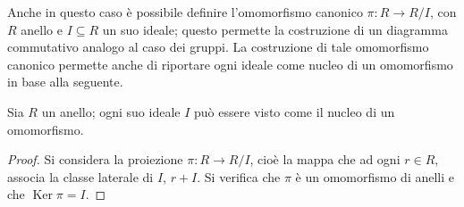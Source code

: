 \documentclass[11pt, a4paper]{scrartcl}
\theoremstyle{definition}
\numberwithin{esempio}{section}
\theoremstyle{definition}
\numberwithin{obs}{section}
\numberwithin{nota}{section}
\numberwithin{equation}{subsection}
\begin{document}
\noindent Anche in questo caso \`e possibile definire l'omomorfismo canonico $\pi : R \to R / I$, con $R$ anello e $I \subseteq R$ un suo ideale; questo permette la costruzione di un diagramma commutativo analogo al caso dei gruppi.
La costruzione di tale omomorfismo canonico permette anche di riportare ogni ideale come nucleo di un omomorfismo in base alla seguente.
\begin{prop}
	{}{}
	Sia $R$ un anello; ogni suo ideale $I$ pu\`o essere visto come il nucleo di un omomorfismo.
	\begin{proof}
		Si considera la proiezione $\pi : R \to R / I$, cio\`e la mappa che ad ogni $r \in R$, associa la classe laterale di $I$, $r + I$.
		Si verifica che $\pi$ \`e un omomorfismo di anelli e che $\operatorname{Ker} \pi = I$.
	\end{proof}
\end{prop}
\end{document}
